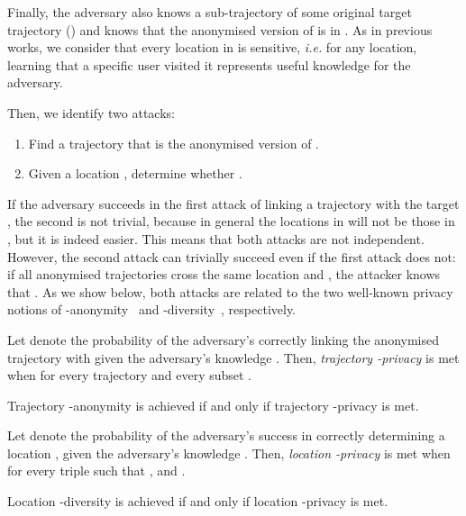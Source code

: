 Finally, the adversary also knows a
sub-trajectory  of some original target trajectory
 () and knows that the
anonymised version of  is in . As in previous works,
we consider that every location in  is sensitive, {\em i.e.}
for any location, learning that a specific user
visited it represents useful knowledge
for the adversary.

Then, we identify two attacks:
\begin{enumerate}
    \item Find a trajectory 
    that is the anonymised version of .
    \item Given a location ,
    determine whether .
\end{enumerate}

If the adversary succeeds in the first attack of
linking a trajectory  with the target , the second
is not trivial, because in general the locations in
 will not be those in , but it is indeed easier.
This means that both attacks
are not independent. However, the second attack
can trivially succeed even if the first attack does not:
if all anonymised trajectories cross the same location 
and , the attacker knows that .
As we show below, both attacks are
related to the two well-known privacy notions of
-anonymity~\cite{samarati98,sweeney02a} and
-diversity~\cite{machanavajjhala06}, respectively.

\begin{definition} \label{def:trajectory_private}
Let  denote the probability of the
adversary's correctly linking the anonymised
trajectory  with  given
the adversary's knowledge . Then, \emph{trajectory -privacy}
is met when  for every trajectory  and every subset .
\end{definition}

\begin{definition}\label{def:anonymity}
Trajectory -anonymity is achieved if and
only if trajectory -privacy is met.
\end{definition}

\begin{definition} \label{def:location_private}
Let  denote the probability of the
adversary's success in correctly determining
a location ,
given the adversary's knowledge .
Then, \emph{location -privacy} is met
when  for every triple  such
that ,  and .
\end{definition}



\begin{definition}\label{def:diversity}
Location -diversity is achieved if and only
if location -privacy is met.
\end{definition}

